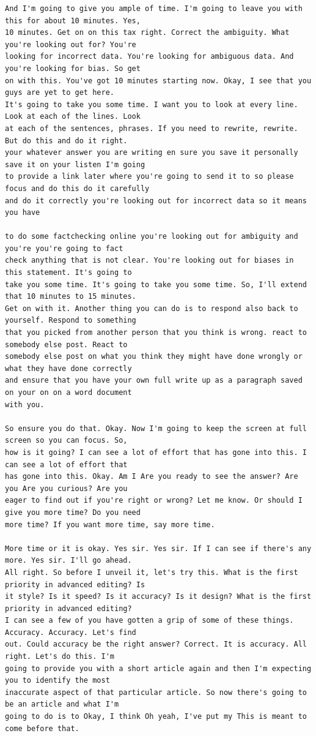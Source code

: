 {\begin{Verbatim}
And I'm going to give you ample of time. I'm going to leave you with this for about 10 minutes. Yes,
10 minutes. Get on on this tax right. Correct the ambiguity. What you're looking out for? You're
looking for incorrect data. You're looking for ambiguous data. And you're looking for bias. So get
on with this. You've got 10 minutes starting now. Okay, I see that you guys are yet to get here.
It's going to take you some time. I want you to look at every line. Look at each of the lines. Look
at each of the sentences, phrases. If you need to rewrite, rewrite. But do this and do it right.
your whatever answer you are writing en sure you save it personally save it on your listen I'm going
to provide a link later where you're going to send it to so please focus and do this do it carefully
and do it correctly you're looking out for incorrect data so it means you have

to do some factchecking online you're looking out for ambiguity and you're you're going to fact
check anything that is not clear. You're looking out for biases in this statement. It's going to
take you some time. It's going to take you some time. So, I'll extend that 10 minutes to 15 minutes.
Get on with it. Another thing you can do is to respond also back to yourself. Respond to something
that you picked from another person that you think is wrong. react to somebody else post. React to
somebody else post on what you think they might have done wrongly or what they have done correctly
and ensure that you have your own full write up as a paragraph saved on your on on a word document
with you.

So ensure you do that. Okay. Now I'm going to keep the screen at full screen so you can focus. So,
how is it going? I can see a lot of effort that has gone into this. I can see a lot of effort that
has gone into this. Okay. Am I Are you ready to see the answer? Are you Are you curious? Are you
eager to find out if you're right or wrong? Let me know. Or should I give you more time? Do you need
more time? If you want more time, say more time.

More time or it is okay. Yes sir. Yes sir. If I can see if there's any more. Yes sir. I'll go ahead.
All right. So before I unveil it, let's try this. What is the first priority in advanced editing? Is
it style? Is it speed? Is it accuracy? Is it design? What is the first priority in advanced editing?
I can see a few of you have gotten a grip of some of these things. Accuracy. Accuracy. Let's find
out. Could accuracy be the right answer? Correct. It is accuracy. All right. Let's do this. I'm
going to provide you with a short article again and then I'm expecting you to identify the most
inaccurate aspect of that particular article. So now there's going to be an article and what I'm
going to do is to Okay, I think Oh yeah, I've put my This is meant to come before that.


\end{Verbatim}}
